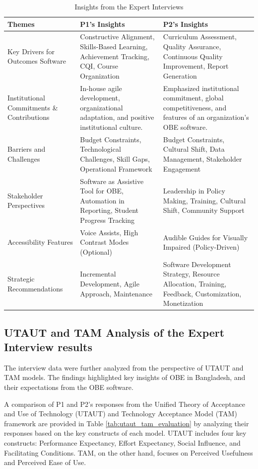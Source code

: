 \documentclass[journal,onecolumn]{IEEEtran}
\begin{document}
\begin{table}[ht]
\centering
\caption{Insights from the Expert Interviews}
\label{tab:expert_insights}
\begin{tabularx}{\textwidth}{|l|X|X|}
\hline
\textbf{Themes} & \textbf{P1’s Insights} & \textbf{P2’s Insights} \\
\hline
Key Drivers for Outcomes Software & Constructive Alignment, Skills-Based Learning, Achievement Tracking, CQI, Course Organization & Curriculum Assessment, Quality Assurance, Continuous Quality Improvement, Report Generation \\
\hline
Institutional Commitments \& Contributions & In-house agile development, organizational adaptation, and positive institutional culture. & Emphasized institutional commitment, global competitiveness, and features of an organization's OBE software. \\
\hline
Barriers and Challenges & Budget Constraints, Technological Challenges, Skill Gaps, Operational Framework & Budget Constraints, Cultural Shift, Data Management, Stakeholder Engagement \\
\hline
Stakeholder Perspectives & Software as Assistive Tool for OBE, Automation in Reporting, Student Progress Tracking & Leadership in Policy Making, Training, Cultural Shift, Community Support \\
\hline
Accessibility Features & Voice Assists, High Contrast Modes (Optional) & Audible Guides for Visually Impaired (Policy-Driven) \\
\hline
Strategic Recommendations & Incremental Development, Agile Approach, Maintenance & Software Development Strategy, Resource Allocation, Training, Feedback, Customization, Monetization \\
\hline
\end{tabularx}
\end{table}




\subsection{\textbf{UTAUT and TAM Analysis of the Expert Interview results}}

The interview data were further analyzed from the perspective of UTAUT and TAM models. The findings highlighted key insights of OBE in Bangladesh, and their expectations from the OBE software. 

A comparison of P1 and P2's responses from the Unified Theory of Acceptance and Use of Technology (UTAUT) and Technology Acceptance Model (TAM) framework are provided in Table \ref{tab:utaut_tam_evaluation} by analyzing their responses based on the key constructs of each model. UTAUT includes four key constructs: Performance Expectancy, Effort Expectancy, Social Influence, and Facilitating Conditions. TAM, on the other hand, focuses on Perceived Usefulness and Perceived Ease of Use.
\end{document}
